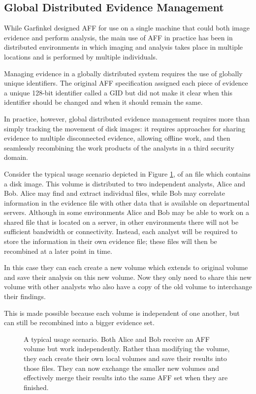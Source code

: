 \documentclass[10pt, conference]{IEEEtran}
\begin{document}
\subsection{Global Distributed Evidence Management}
While Garfinkel designed AFF for use on a single machine that could
both image evidence and perform analysis, the main use of AFF in
practice has been in distributed environments in which imaging and
analysis takes place in multiple locations and is performed by
multiple individuals.

Managing evidence in a globally distributed system requires the use of
globally unique identifiers. The original AFF specification assigned
each piece of evidence a unique 128-bit identifier called a GID but did
not make it clear when this identifier should be changed and when it
should remain the same. 

In practice, however, global distributed evidence management requires
more than simply tracking the movement of disk images: it requires
approaches for sharing evidence to multiple disconnected
evidence, allowing offline work, and then seamlessly recombining the
work products of the analysts in a third security domain.

Consider the typical usage scenario depicted in Figure \ref{usage}, of
an file which contains a disk image. This volume is distributed to two
independent analysts, Alice and Bob. Alice may find and extract
individual files, while Bob may correlate information in the evidence
file with other data that is available on departmental
servers. Although in some environments Alice and Bob may be able to
work on a shared file that is located on a server, in other
environments there will not be sufficient bandwidth or
connectivity. Instead, each analyst will be required to store the
information in their own evidence file; these files will then be
recombined at a later point in time.

In this case they can
each create a new volume which extends to original volume and save
their analysis on this new volume. Now they only need to share this
new volume with other analysts who also have a copy of the old volume
to interchange their findings. 

This is made possible because each volume is independent of one
another, but can still be recombined into a bigger evidence set. 

\begin{figure}[tb]
  \begin{center}
  \mbox{\columnwidth {}}
  \caption{A typical usage scenario. Both Alice and Bob receive an AFF
  volume but work independently. Rather than modifying the volume,
  they each create their own local volumes and save their results into
  those files. They can now exchange the smaller new volumes and
  effectively merge their results into the same AFF set when they are finished.}
  \label{usage}
  \end{center}
\end{figure}
\end{document}
